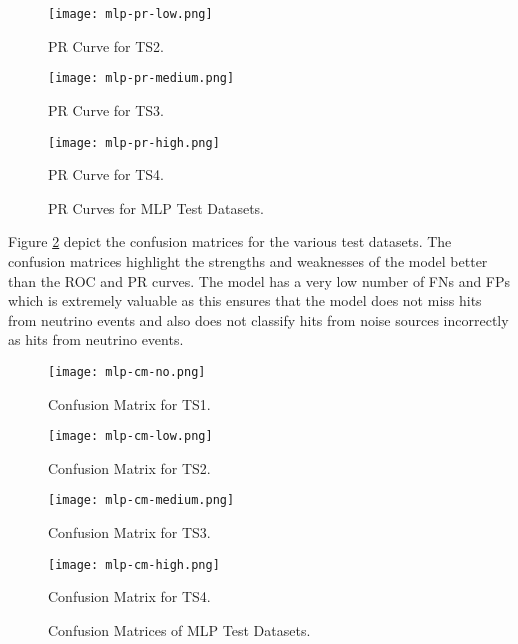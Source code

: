 \begin{figure}[htb]
  \centering
  \begin{minipage}{0.32\textwidth}
    \centering
    \texttt{[image: mlp-pr-low.png]}
    \caption{PR Curve for TS2.}
  \end{minipage}
  \begin{minipage}{0.32\textwidth}
    \centering
    \texttt{[image: mlp-pr-medium.png]}
    \caption{PR Curve for TS3.}
  \end{minipage}
  \begin{minipage}{0.32\textwidth}
    \centering
    \texttt{[image: mlp-pr-high.png]}
    \caption{PR Curve for TS4.}
  \end{minipage}
  \caption{PR Curves for MLP Test Datasets.}
  \label{fig:mlp-pr}
\end{figure}

Figure \ref{fig:mlp-cm} depict the confusion matrices for the various
test datasets. The confusion matrices highlight the strengths and
weaknesses of the model better than the ROC and PR curves. The model
has a very low number of FNs and FPs which is extremely valuable as
this ensures that the model does not miss hits from neutrino events
and also does not classify hits from noise sources incorrectly as hits
from neutrino events.

\begin{figure}[htb]
  \centering
  \begin{minipage}{0.49\textwidth}
    \centering
    \texttt{[image: mlp-cm-no.png]}
    \caption{Confusion Matrix for TS1.}
    \label{fig:mlp-cm-no}
  \end{minipage}
  \begin{minipage}{0.49\textwidth}
    \centering
    \texttt{[image: mlp-cm-low.png]}
    \caption{Confusion Matrix for TS2.}
    \label{fig:mlp-cm-low}
  \end{minipage}
  \begin{minipage}{0.49\textwidth}
    \centering
    \texttt{[image: mlp-cm-medium.png]}
    \caption{Confusion Matrix for TS3.}
    \label{fig:mlp-cm-medium}
  \end{minipage}
  \begin{minipage}{0.49\textwidth}
    \centering
    \texttt{[image: mlp-cm-high.png]}
    \caption{Confusion Matrix for TS4.}
    \label{fig:mlp-cm-high}
  \end{minipage}
  \caption{Confusion Matrices of MLP Test Datasets.}
  \label{fig:mlp-cm}
\end{figure}

